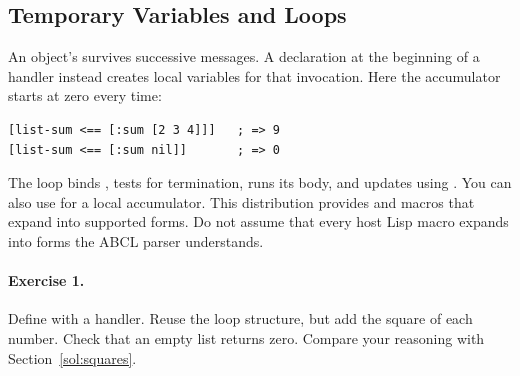 \subsection{Temporary Variables and Loops}

An object's  survives successive messages.
A  declaration at the beginning of a handler instead
creates local variables for that invocation. Here the accumulator starts
at zero every time:


\begin{lstlisting}
[list-sum <== [:sum [2 3 4]]]   ; => 9
[list-sum <== [:sum nil]]       ; => 0
\end{lstlisting}

The  loop binds , tests for termination, runs its body,
and updates  using . You can also use 
for a local accumulator. This distribution provides 
and  macros that expand into supported  forms.
Do not assume that every host Lisp macro expands into forms the ABCL
parser understands.

\paragraph{Exercise 1.}
Define  with a  handler. Reuse the loop structure,
but add the square of each number. Check that an empty list returns zero.
Compare your reasoning with Section~\ref{sol:squares}.
